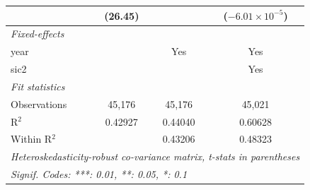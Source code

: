 \begin{tabular}{lccc}
                 & (26.45)           &                   & ($-6.01\times 10^{-5}$)\\    
   \midrule
   \emph{Fixed-effects}\\
   year          &                   & Yes               & Yes\\  
   sic2          &                   &                   & Yes\\  
   \midrule
   \emph{Fit statistics}\\
   Observations  & 45,176            & 45,176            & 45,021\\  
   R$^2$         & 0.42927           & 0.44040           & 0.60628\\  
   Within R$^2$  &                   & 0.43206           & 0.48323\\  
   \midrule \midrule
   \multicolumn{4}{l}{\emph{Heteroskedasticity-robust co-variance matrix, t-stats in parentheses}}\\
   \multicolumn{4}{l}{\emph{Signif. Codes: ***: 0.01, **: 0.05, *: 0.1}}\\
\end{tabular}
\par\endgroup


